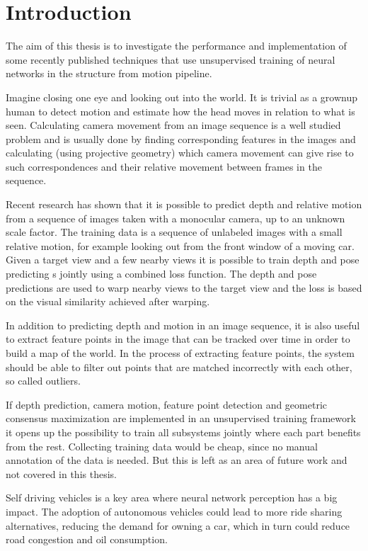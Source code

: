 \chapter{Introduction}\label{cha:introduction}

The aim of this thesis is to investigate the performance and implementation of some recently published techniques that use unsupervised training of neural networks in the structure from motion pipeline. 

Imagine closing one eye and looking out into the world. It is trivial as a grownup human to detect motion and estimate how the head moves in relation to what is seen. Calculating camera movement from an image sequence is a well studied problem and is usually done by finding corresponding features in the images and calculating (using projective geometry) which camera movement can give rise to such correspondences and their relative movement between frames in the sequence.

Recent research has shown that it is possible to predict depth and relative motion from a sequence of images taken with a monocular \abbrRGB camera, up to an unknown scale factor. The training data is a sequence of unlabeled images with a small relative motion, for example looking out from the front window of a moving car. Given a target view and a few nearby views it is possible to train depth and pose predicting \abbrCNN{}s jointly using a combined loss function. The depth and pose predictions are used to warp nearby views to the target view and the loss is based on the visual similarity achieved after warping.

In addition to predicting depth and motion in an image sequence, it is also useful to extract feature points in the image that can be tracked over time in order to build a map of the world. In the process of extracting feature points, the system should be able to filter out points that are matched incorrectly with each other, so called outliers.

If depth prediction, camera motion, feature point detection and geometric consensus maximization are implemented in an unsupervised training framework it opens up the possibility to train all subsystems jointly where each part benefits from the rest. Collecting training data would be cheap, since no manual annotation of the data is needed. But this is left as an area of future work and not covered in this thesis.

Self driving vehicles is a key area where neural network perception has a big impact. The adoption of autonomous vehicles could lead to more ride sharing alternatives, reducing the demand for owning a car, which in turn could reduce road congestion and oil consumption. \cite{transportation}

